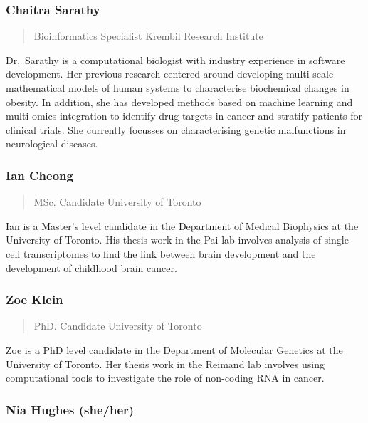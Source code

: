\documentclass[
]{book}
\begin{document}
\subsubsection{Chaitra Sarathy}\label{chaitra-sarathy}

\begin{quote}
Bioinformatics Specialist
Krembil Research Institute
\end{quote}

Dr.~Sarathy is a computational biologist with industry experience in software development. Her previous research centered around developing multi-scale mathematical models of human systems to characterise biochemical changes in obesity. In addition, she has developed methods based on machine learning and multi-omics integration to identify drug targets in cancer and stratify patients for clinical trials. She currently focusses on characterising genetic malfunctions in neurological diseases.

\subsubsection{Ian Cheong}\label{ian-cheong}

\begin{quote}
MSc. Candidate
University of Toronto
\end{quote}

Ian is a Master's level candidate in the Department of Medical Biophysics at the University of Toronto. His thesis work in the Pai lab involves analysis of single-cell transcriptomes to find the link between brain development and the development of childhood brain cancer.

\subsubsection{Zoe Klein}\label{zoe-klein}

\begin{quote}
PhD. Candidate
University of Toronto
\end{quote}

Zoe is a PhD level candidate in the Department of Molecular Genetics at the University of Toronto. Her thesis work in the Reimand lab involves using computational tools to investigate the role of non-coding RNA in cancer.

\subsubsection{Nia Hughes (she/her)}\label{nia-hughes-sheher}
\end{document}

